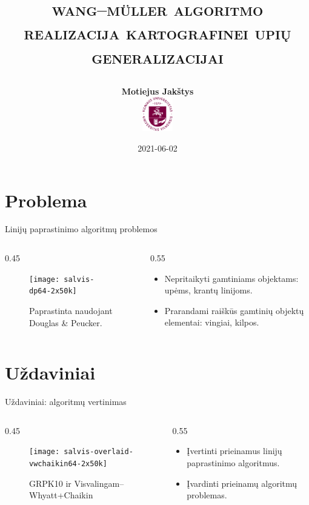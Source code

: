 \documentclass[14pt]{beamer}
\title{
    \Large\textsc{wang–müller algoritmo realizacija 
    kartografinei upių generalizacijai}

}
\author{\small \bf Motiejus Jakštys \\[4ex]
    \includegraphics[height=4em]{vu}
}
\date{\small 2021-06-02}
\newcommand{\DP}{Douglas \& Peucker}
\newcommand{\VW}{Visvalingam--Whyatt}
\newcommand{\WM}{Wang--M{\"u}ller}
\newcommand{\twocols}[2]
{
    \begin{columns}[c]
        \begin{column}{0.45\textwidth}
            #1
        \end{column}
        \begin{column}{0.55\textwidth}
            #2
        \end{column}
    \end{columns}
}
\begin{document}

\begin{frame}
\titlepage
\end{frame}

%
%

\section{Problema}

\begin{frame}{Linijų paprastinimo algoritmų problemos}
  \twocols{
    \begin{figure}[ht]
      \texttt{[image: salvis-dp64-2x50k]}
      \caption{\footnotesize Paprastinta naudojant {\DP}.}
    \end{figure}
  }{
    \begin{itemize}
      \item Nepritaikyti gamtiniams objektams: upėms, krantų linijoms.
      \item Prarandami raiškūs gamtinių objektų elementai: vingiai, kilpos.
    \end{itemize}
  }
\end{frame}

\section{Uždaviniai}

\begin{frame}{Uždaviniai: algoritmų vertinimas}
  \twocols{
    \begin{figure}[ht]
      \texttt{[image: salvis-overlaid-vwchaikin64-2x50k]}
      \caption{\footnotesize GRPK10 ir {\VW}+Chaikin}
    \end{figure}
  }{
    \begin{itemize}
      \item Įvertinti prieinamus linijų paprastinimo algoritmus.
      \item Įvardinti prieinamų algoritmų problemas.
    \end{itemize}
  }
\end{frame}
\end{document}
